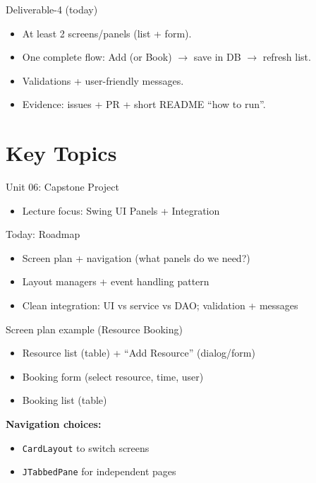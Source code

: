 \documentclass{beamer}
\begin{document}
\begin{frame}{Deliverable-4 (today)}
  \begin{itemize}[<+->]
    \item At least 2 screens/panels (list + form).
    \item One complete flow: Add (or Book) $\rightarrow$ save in DB $\rightarrow$ refresh list.
    \item Validations + user-friendly messages.
    \item Evidence: issues + PR + short README ``how to run''.
  \end{itemize}
  \slidesources{\OOPSUnitVISources}
\end{frame}

\section{Key Topics}
\label{sec:concepts}

\begin{frame}{Unit 06: Capstone Project}
  \begin{itemize}[<+->]
    \item Lecture focus: Swing UI Panels + Integration
  \end{itemize}
  \slidesources{\OOPSUnitVISources}
\end{frame}

\begin{frame}{Today: Roadmap}
  \begin{itemize}[<+->]
    \item Screen plan + navigation (what panels do we need?)
    \item Layout managers + event handling pattern
    \item Clean integration: UI vs service vs DAO; validation + messages
  \end{itemize}
  \slidesources{\OOPSUnitVISources}
\end{frame}

\begin{frame}{Screen plan example (Resource Booking)}
  \begin{itemize}[<+->]
    \item Resource list (table) + ``Add Resource'' (dialog/form)
    \item Booking form (select resource, time, user)
    \item Booking list (table)
  \end{itemize}
  \vspace{0.6em}
  \textbf{Navigation choices:}
  \begin{itemize}[<+->]
    \item \texttt{CardLayout} to switch screens
    \item \texttt{JTabbedPane} for independent pages
  \end{itemize}
  \slidesources{\OOPSUnitVISources}
\end{frame}
\end{document}
